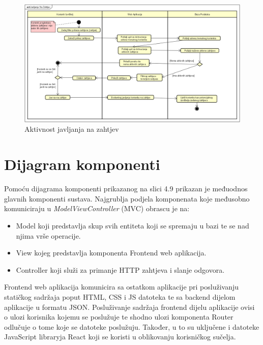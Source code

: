 			
			\begin{figure}[H]
				\includegraphics[scale=0.6]{slike/dijagram_aktivnosti.png} %
				\centering
				\caption{Aktivnost javljanja na zahtjev}
				
			\end{figure}
			
			\eject
			
		\section{Dijagram komponenti}
		
			Pomoću dijagrama komponenti prikazanog na slici 4.9 prikazan je međuodnos glavnih komponenti sustava.
			Najgrublja podjela komponenata koje međusobno komuniciraju u \textit{ModelViewController} (MVC) obrascu je na:
			\begin{itemize}
				\item Model koji predstavlja skup svih entiteta koji se spremaju u bazi te se nad njima vrše operacije.
				\item View kojeg predstavlja komponenta Frontend web aplikacija.
				\item Controller koji služi za primanje HTTP zahtjeva i slanje odgovora.
			\end{itemize}
			
			Frontend web aplikacija komunicira sa ostatkom aplikacije pri posluživanju statičkog sadržaja poput HTML, CSS i JS datoteka te sa backend dijelom aplikacije u formatu JSON.
			Posluživanje sadržaja frontend dijelu aplikacije ovisi o ulozi korisnika kojemu se poslužuje te
			shodno ulozi komponenta Router odlučuje o tome koje se datoteke poslužuju. Također, u to su uključene i datoteke JavaScript libraryja React koji se koristi u oblikovanju korisničkog sučelja.
			
